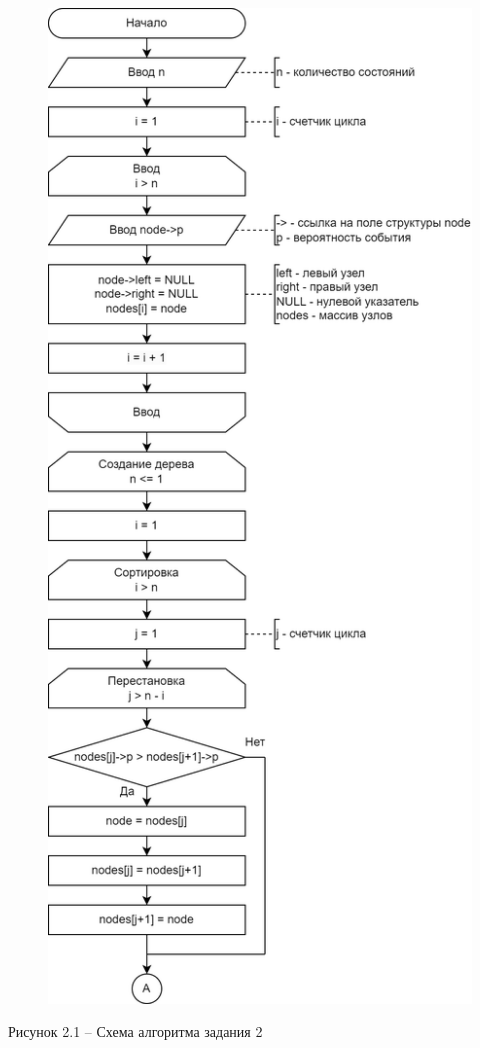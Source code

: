 \documentclass[a4paper,14pt]{extarticle}
\begin{document}
	\begin{figure}[h]
		\centering
		\includegraphics[width=0.5\linewidth]{schemes/s-2-1}
	\end{figure}
	\begin{center}
		Рисунок 2.1 – Схема алгоритма задания 2
	\end{center}
	\pagebreak
	
\end{document}
